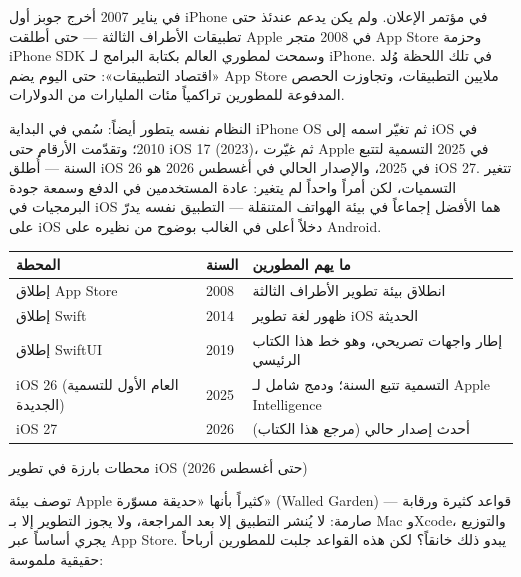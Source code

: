 


في يناير 2007 أخرج جوبز أول iPhone في مؤتمر الإعلان. ولم يكن يدعم عندئذ حتى تطبيقات الأطراف الثالثة — حتى أطلقت Apple في 2008 متجر App Store وحزمة iPhone SDK وسمحت لمطوري العالم بكتابة البرامج لـ iPhone. في تلك اللحظة وُلد «اقتصاد التطبيقات»: حتى اليوم يضم App Store ملايين التطبيقات، وتجاوزت الحصص المدفوعة للمطورين تراكمياً مئات المليارات من الدولارات.

النظام نفسه يتطور أيضاً: سُمي في البداية iPhone OS ثم تغيّر اسمه إلى iOS في 2010؛ وتقدّمت الأرقام حتى iOS 17 (2023)، ثم غيّرت Apple في 2025 التسمية لتتبع السنة — أُطلق iOS 26 في 2025، والإصدار الحالي في أغسطس 2026 هو iOS 27. تتغير التسميات، لكن أمراً واحداً لم يتغير: عادة المستخدمين في الدفع وسمعة جودة البرمجيات في iOS هما الأفضل إجماعاً في بيئة الهواتف المتنقلة — التطبيق نفسه يدرّ على iOS دخلاً أعلى في الغالب بوضوح من نظيره على Android.

\begin{center}
\begin{tabularx}{\linewidth}{|X|X|X|}
\hline
\textbf{المحطة} & \textbf{السنة} & \textbf{ما يهم المطورين} \tabularnewline
\hline
إطلاق App Store & 2008 & انطلاق بيئة تطوير الأطراف الثالثة \tabularnewline
إطلاق Swift & 2014 & ظهور لغة تطوير iOS الحديثة \tabularnewline
إطلاق SwiftUI & 2019 & إطار واجهات تصريحي، وهو خط هذا الكتاب الرئيسي \tabularnewline
iOS 26 (العام الأول للتسمية الجديدة) & 2025 & التسمية تتبع السنة؛ ودمج شامل لـ Apple Intelligence \tabularnewline
iOS 27 & 2026 & أحدث إصدار حالي (مرجع هذا الكتاب) \tabularnewline
\hline
\end{tabularx}
\end{center}

\begin{center}\small\color{gray}محطات بارزة في تطوير iOS (حتى أغسطس 2026)\end{center}


توصف بيئة Apple كثيراً بأنها «حديقة مسوّرة» (Walled Garden) — قواعد كثيرة ورقابة صارمة: لا يُنشر التطبيق إلا بعد المراجعة، ولا يجوز التطوير إلا بـ Mac وXcode، والتوزيع يجري أساساً عبر App Store. يبدو ذلك خانقاً؟ لكن هذه القواعد جلبت للمطورين أرباحاً حقيقية ملموسة:

